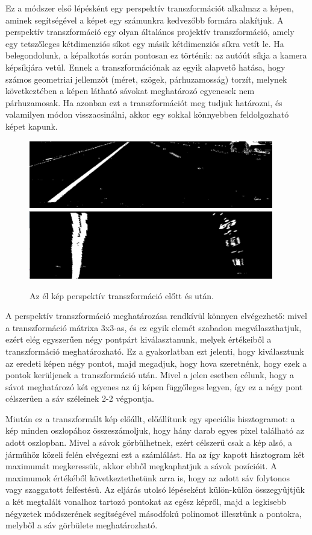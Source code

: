 \documentclass[12pt,a4paper,oneside]{report}             %
\begin{document}
Ez a módszer első lépésként egy perspektív transzformációt alkalmaz a képen, aminek segítségével a képet egy számunkra kedvezőbb formára alakítjuk. A perspektív transzformáció egy olyan általános projektív transzformáció, amely egy tetszőleges kétdimenziós síkot egy másik kétdimenziós síkra vetít le. Ha belegondolunk, a képalkotás során pontosan ez történik: az autóút síkja a kamera képsíkjára vetül. Ennek a transzformációnak az egyik alapvető hatása, hogy számos geometriai jellemzőt (méret, szögek, párhuzamosság) torzít, melynek következtében a képen látható sávokat meghatározó egyenesek nem párhuzamosak. Ha azonban ezt a transzformációt meg tudjuk határozni, és valamilyen módon visszacsinálni, akkor egy sokkal könnyebben feldolgozható képet kapunk.

\begin{figure}
	\centering
	\includegraphics[width=0.95\textwidth]{images/11.png}
	\includegraphics[width=0.95\textwidth]{images/12.png}
	\label{fig:1}
	\caption{Az él kép perspektív transzformáció előtt és után.}
\end{figure}

A perspektív transzformáció meghatározása rendkívül könnyen elvégezhető: mivel a transzformáció mátrixa 3x3-as, és ez egyik elemét szabadon megválaszthatjuk, ezért elég egyszerűen négy pontpárt kiválasztanunk, melyek értékeiből a transzformáció meghatározható. Ez a gyakorlatban ezt jelenti, hogy kiválasztunk az eredeti képen négy pontot, majd megadjuk, hogy hova szeretnénk, hogy ezek a pontok kerüljenek a transzformáció után. Mivel a jelen esetben célunk, hogy a sávot meghatározó két egyenes az új képen függőleges legyen, így ez a négy pont célszerűen a sáv széleinek 2-2 végpontja.

Miután ez a transzformált kép előállt, előállítunk egy speciális hisztogramot: a kép minden oszlopához összeszámoljuk, hogy hány darab egyes pixel található az adott oszlopban. Mivel a sávok görbülhetnek, ezért célszerű csak a kép alsó, a járműhöz közeli felén elvégezni ezt a számlálást. Ha az így kapott hisztogram két maximumát megkeressük, akkor ebből megkaphatjuk a sávok pozícióit. A maximumok értékéből következtethetünk arra is, hogy az adott sáv folytonos vagy szaggatott felfestésű. Az eljárás utolsó lépéseként külön-külön összegyűjtjük a két megtalált vonalhoz tartozó pontokat az egész képről, majd a legkisebb négyzetek módszerének segítségével másodfokú polinomot illesztünk a pontokra, melyből a sáv görbülete meghatározható.
\end{document}
